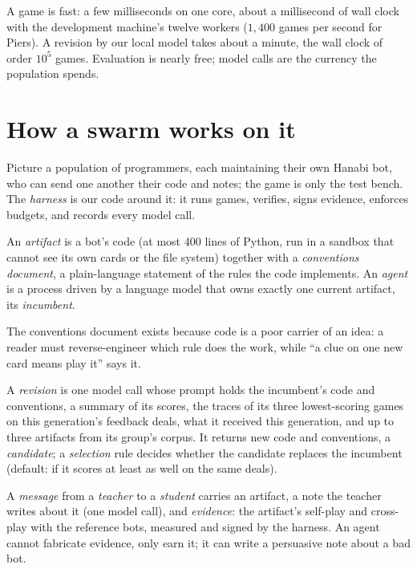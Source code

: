 \documentclass[11pt]{article}
\numberwithin{theorem}{section}
\theoremstyle{definition}
\begin{document}
A game is fast: a few milliseconds on one core, about a millisecond of wall clock with the development machine's twelve
workers ($1{,}400$ games per second for Piers). A revision by our local model takes about a minute, the wall clock of
order $10^5$ games. Evaluation is nearly free; model calls are the currency the population spends.

\section{How a swarm works on it}\label{sec:swarm}

Picture a population of programmers, each maintaining their own Hanabi bot, who can send one another their code and
notes; the game is only the test bench. The \emph{harness} is our code around it: it runs games, verifies, signs
evidence, enforces budgets, and records every model call.

\begin{definition}
An \emph{artifact} is a bot's code (at most $400$ lines of Python, run in a sandbox that cannot see its own cards or the
file system) together with a \emph{conventions document}, a plain-language statement of the rules the code implements.
An \emph{agent} is a process driven by a language model that owns exactly one current artifact, its \emph{incumbent}.
\end{definition}

The conventions document exists because code is a poor carrier of an idea: a reader must reverse-engineer which rule
does the work, while ``a clue on one new card means play it'' says it.

\begin{definition}
A \emph{revision} is one model call whose prompt holds the incumbent's code and conventions, a summary of its scores,
the traces of its three lowest-scoring games on this generation's feedback deals, what it received this generation,
and up to three artifacts from its group's corpus. It returns new code and conventions, a \emph{candidate}; a
\emph{selection} rule decides whether the candidate
replaces the incumbent (default: if it scores at least as well on the same deals).
\end{definition}

\begin{definition}
A \emph{message} from a \emph{teacher} to a \emph{student} carries an artifact, a note the teacher writes about it (one
model call), and \emph{evidence}: the artifact's self-play and cross-play with the reference bots, measured and signed
by the harness. An agent cannot fabricate evidence, only earn it; it can write a persuasive note about a bad bot.
\end{definition}
\end{document}
